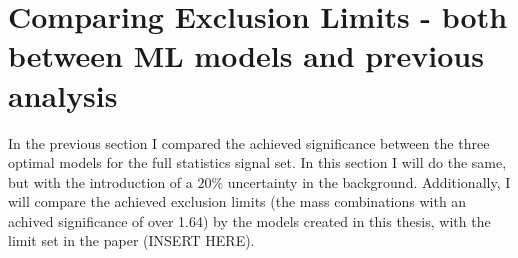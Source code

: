 \section{Comparing Exclusion Limits - both between ML models and previous analysis}
In the previous section I compared the achieved significance between 
the three optimal models for the full statistics signal set. In this section 
I will do the same, but with the introduction of a $20\%$ uncertainty in the background.
Additionally, I will compare the achieved exclusion limits (the mass combinations with an achived 
significance of over 1.64) by the models created in this thesis, with the limit set in the paper (INSERT 
HERE).
